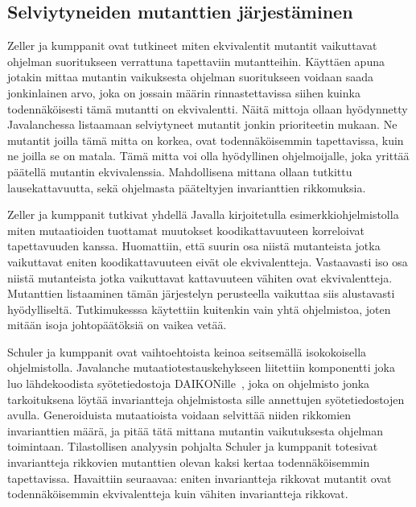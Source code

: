 \documentclass{tktltiki}
\begin{document}
\subsection{Selviytyneiden mutanttien järjestäminen}
Zeller ja kumppanit ovat tutkineet miten ekvivalentit mutantit vaikuttavat ohjelman suoritukseen verrattuna tapettaviin mutantteihin. Käyttäen apuna jotakin mittaa mutantin vaikuksesta ohjelman suoritukseen voidaan saada jonkinlainen arvo, joka on jossain määrin rinnastettavissa siihen kuinka todennäköisesti tämä mutantti on ekvivalentti. Näitä mittoja ollaan hyödynnetty Javalanchessa listaamaan selviytyneet mutantit jonkin prioriteetin mukaan. Ne mutantit joilla tämä mitta on korkea, ovat todennäköisemmin tapettavissa, kuin ne joilla se on matala. Tämä mitta voi olla hyödyllinen ohjelmoijalle, joka yrittää päätellä mutantin ekvivalenssia. Mahdollisena mittana ollaan tutkittu lausekattavuutta, sekä ohjelmasta pääteltyjen invarianttien rikkomuksia.

Zeller ja kumppanit tutkivat yhdellä Javalla kirjoitetulla esimerkkiohjelmistolla miten mutaatioiden tuottamat muutokset koodikattavuuteen korreloivat tapettavuuden kanssa. Huomattiin, että suurin osa niistä mutanteista jotka vaikuttavat eniten koodikattavuuteen eivät ole ekvivalentteja. Vastaavasti iso osa niistä mutanteista jotka vaikuttavat kattavuuteen vähiten ovat ekvivalentteja. Mutanttien listaaminen tämän järjestelyn perusteella vaikuttaa siis alustavasti hyödylliseltä. Tutkimukesssa käytettiin kuitenkin vain yhtä ohjelmistoa, joten mitään isoja johtopäätöksiä on vaikea vetää.

Schuler ja kumppanit ovat vaihtoehtoista keinoa seitsemällä isokokoisella ohjelmistolla. Javalanche mutaatiotestauskehykseen liitettiin komponentti joka luo lähdekoodista syötetiedostoja DAIKONille~\cite{SchulerDZ09}, joka on ohjelmisto jonka tarkoituksena löytää invariantteja ohjelmistosta sille annettujen syötetiedostojen avulla. Generoiduista mutaatioista voidaan selvittää niiden rikkomien invarianttien määrä, ja pitää tätä mittana mutantin vaikutuksesta ohjelman toimintaan. Tilastollisen analyysin pohjalta Schuler ja kumppanit totesivat invariantteja rikkovien mutanttien olevan kaksi kertaa todennäköisemmin tapettavissa. Havaittiin seuraavaa: eniten invariantteja rikkovat mutantit ovat todennäköisemmin ekvivalentteja kuin vähiten invariantteja rikkovat.
\end{document}
